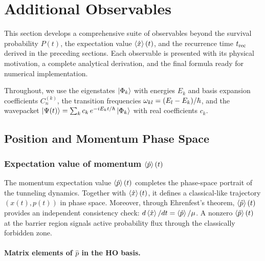 \section{Additional Observables}\label{sec:additional_obs}

This section develops a comprehensive suite of observables beyond the survival probability $P(t)$, the expectation value $\expval{\hat{x}}(t)$, and the recurrence time $t_{\text{rec}}$ derived in the preceding sections.
Each observable is presented with its physical motivation, a complete analytical derivation, and the final formula ready for numerical implementation.

Throughout, we use the eigenstates $\ket{\Phi_k}$ with energies $E_k$ and basis expansion coefficients $C_n^{(k)}$, the transition frequencies $\omega_{kl} = (E_l - E_k)/\hbar$, and the wavepacket $\ket{\Psi(t)} = \sum_k c_k\,e^{-iE_k t/\hbar}\ket{\Phi_k}$ with real coefficients $c_k$.

\subsection{Position and Momentum Phase Space}\label{sec:phase_space}

\subsubsection{Expectation value of momentum $\expval{\hat{p}}(t)$}\label{sec:pexp}

\begin{remark}
The momentum expectation value $\expval{\hat{p}}(t)$ completes the phase-space portrait of the tunneling dynamics.
Together with $\expval{\hat{x}}(t)$, it defines a classical-like trajectory $(x(t),p(t))$ in phase space.
Moreover, through Ehrenfest's theorem, $\expval{\hat{p}}(t)$ provides an independent consistency check: $d\expval{\hat{x}}/dt = \expval{\hat{p}}/\mu$.
A nonzero $\expval{\hat{p}}(t)$ at the barrier region signals active probability flux through the classically forbidden zone.
\end{remark}

\paragraph{Matrix elements of $\hat{p}$ in the HO basis.}

